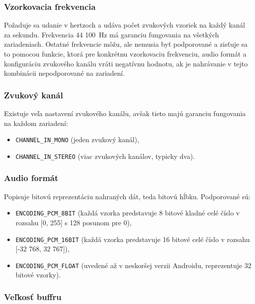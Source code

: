 \subsubsection{Vzorkovacia frekvencia}

Požaduje sa udanie v hertzoch a udáva počet zvukových vzoriek na každý kanál za sekundu. Frekvencia 44 100~Hz má garanciu fungovania na všetkých zariadeniach. Ostatné frekvencie môžu, ale nemusia byť podporované a zisťuje sa to pomocou funkcie, ktorá pre konkrétnu vzorkovaciu frekvenciu, audio formát a konfiguráciu zvukového kanálu vráti negatívnu hodnotu, ak je nahrávanie v tejto kombinácii nepodporované na zariadení. 

\subsubsection{Zvukový kanál}

Existuje veľa nastavení zvukového kanálu, avšak tieto majú garanciu fungovania na každom zariadení:

\begin{itemize}
  \item{\texttt{CHANNEL\_IN\_MONO} (jeden zvukový kanál),}
  \item{\texttt{CHANNEL\_IN\_STEREO} (viac zvukových kanálov, typicky dva).}
\end{itemize}

\subsubsection{Audio formát}

Popisuje bitovú reprezentáciu nahraných dát, teda bitovú hĺbku. Podporované sú:

\begin{itemize}
  \item{\texttt{ENCODING\_PCM\_8BIT} (každá vzorka predstavuje 8 bitové kladné celé číslo v rozsahu [0, 255] s 128 posunom pre 0),}
  \item{\texttt{ENCODING\_PCM\_16BIT} (každá vzorka predstavuje 16 bitové celé číslo v rozsahu [-32 768, 32 767]),}
  \item{\texttt{ENCODING\_PCM\_FLOAT} (uvedené až v neskoršej verzii Androidu, reprezentuje 32 bitové vzorky).}
\end{itemize}

\subsubsection{Veľkosť buffru}

